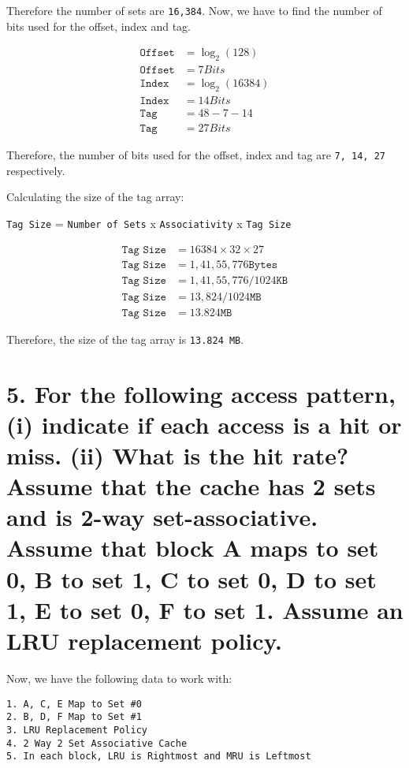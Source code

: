 \documentclass[11pt]{article}
\begin{document}
Therefore the number of sets are \texttt{16,384}.
Now, we have to find the number of bits used for the offset, index and tag.

\begin{equation}
\begin{split}
\texttt{Offset} &= \log_2(128) \\
\texttt{Offset} &= 7 Bits\\
\texttt{Index} &= \log_2(16384) \\
\texttt{Index} &= 14 Bits\\
\texttt{Tag} &= 48 - 7 - 14 \\
\texttt{Tag} &= 27 Bits
\end{split}
\end{equation}
    
Therefore, the number of bits used for the offset, index and tag are \texttt{7, 14, 27} respectively.

Calculating the size of the tag array:

\texttt{Tag Size} = \texttt{Number of Sets} x \texttt{Associativity} x \texttt{Tag Size}

\begin{equation}
\begin{split}
\texttt{Tag Size} &= 16384 \times 32 \times 27 \\
\texttt{Tag Size} &= 1,41,55,776  \texttt{Bytes} \\
\texttt{Tag Size} &= 1,41,55,776 / 1024 \texttt{KB} \\
\texttt{Tag Size} &= 13,824 / 1024 \texttt{MB} \\
\texttt{Tag Size} &= 13.824 \texttt{MB}
\end{split}
\end{equation}

Therefore, the size of the tag array is \texttt{13.824 MB}.

\newpage

\section*{5. For the following access pattern, (i) indicate if each access is a hit or miss. (ii) What is the hit rate? Assume that the cache has 2 sets and is 2-way set-associative. Assume that block A maps to set 0, B to set 1, C to set 0, D to set 1, E to set 0, F to set 1. Assume an LRU replacement policy.}


Now, we have the following data to work with:
\begin{verbatim}
1. A, C, E Map to Set #0
2. B, D, F Map to Set #1
3. LRU Replacement Policy
4. 2 Way 2 Set Associative Cache
5. In each block, LRU is Rightmost and MRU is Leftmost
\end{verbatim}
\end{document}
